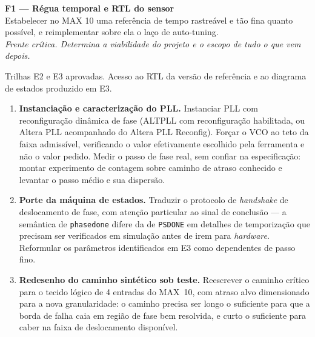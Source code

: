 \documentclass[11pt,a4paper]{article}
\newcommand{\frenteheader}[3]{%
  \vspace{6pt}
  \noindent\begin{tcolorbox}[enhanced,colback=lescblue,colframe=lescblue,
    boxrule=0pt,left=9pt,right=9pt,top=6pt,bottom=6pt,arc=2pt]
    {\color{white}\bfseries\large #1}\\[2pt]
    {\color{white!85!lescblue}\small #2}\\[1pt]
    {\color{white!75!lescblue}\footnotesize\itshape #3}
  \end{tcolorbox}
  \vspace{4pt}}
\newcommand{\campo}[1]{\vspace{6pt}\noindent{\bfseries\color{lescgray}#1}\par\vspace{2pt}}
\begin{document}
\frenteheader{F1 --- Régua temporal e RTL do sensor}
{Estabelecer no MAX 10 uma referência de tempo rastreável e tão fina quanto possível, e reimplementar sobre ela o laço de auto-tuning.}
{Frente crítica. Determina a viabilidade do projeto e o escopo de tudo o que vem depois.}

\campo{Pré-requisitos}
Trilhas E2 e E3 aprovadas. Acesso ao RTL da versão de referência e ao diagrama de
estados produzido em E3.

\campo{Tarefas}
\begin{enumerate}
  \item \textbf{Instanciação e caracterização do PLL.}
        Instanciar PLL com reconfiguração dinâmica de fase (ALTPLL com reconfiguração
        habilitada, ou Altera PLL acompanhado do Altera PLL Reconfig). Forçar o VCO ao
        teto da faixa admissível, verificando o valor efetivamente escolhido pela
        ferramenta e não o valor pedido. Medir o passo de fase real, sem confiar na
        especificação: montar experimento de contagem sobre caminho de atraso conhecido
        e levantar o passo médio e sua dispersão.

  \item \textbf{Porte da máquina de estados.}
        Traduzir o protocolo de \emph{handshake} de deslocamento de fase, com atenção
        particular ao sinal de conclusão --- a semântica de \texttt{phasedone} difere
        da de \texttt{PSDONE} em detalhes de temporização que precisam ser verificados
        em simulação antes de irem para \emph{hardware}. Reformular os parâmetros
        identificados em E3 como dependentes de passo fino.

  \item \textbf{Redesenho do caminho sintético sob teste.}
        Reescrever o caminho crítico para o tecido lógico de 4 entradas do MAX~10, com
        atraso alvo dimensionado para a nova granularidade: o caminho precisa ser longo
        o suficiente para que a borda de falha caia em região de fase bem resolvida, e
        curto o suficiente para caber na faixa de deslocamento disponível.


\end{enumerate}
\end{document}
